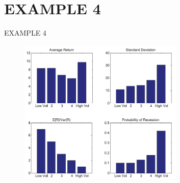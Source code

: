\documentclass[9pt]{beamer}
\begin{document}
\section{EXAMPLE 4}
\begin{frame}{EXAMPLE 4}
   \begin{figure}[h]
			\centering
			\includegraphics[width = 0.7\textwidth]{img/MM.PNG}
            \label{fig:MManalysis}
	\end{figure}
\end{frame}
    
\end{document}
